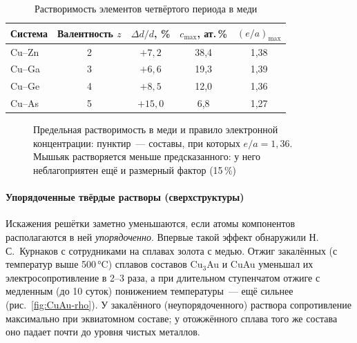 \begin{table}[ht]
\centering
\caption{Растворимость элементов четвёртого периода в меди}
\label{tab:Cu-sol}
\small
\begin{tabular}{@{}lcccc@{}}
\toprule
Система & Валентность $z$ & $\Delta d/d$, \% & $c_\text{max}$, ат.\,\% & $(e/a)_\text{max}$ \\
\midrule
Cu--Zn & 2 & $+7{,}2$ & 38,4 & 1,38 \\
Cu--Ga & 3 & $+6{,}6$ & 19,3 & 1,39 \\
Cu--Ge & 4 & $+8{,}5$ & 12,0 & 1,36 \\
Cu--As & 5 & $+15{,}0$ & 6,8 & 1,27 \\
\bottomrule
\end{tabular}
\end{table}

\begin{figure}[ht]
\centering
{}
\caption{Предельная растворимость в меди и правило электронной
концентрации: пунктир~— составы, при которых $e/a=1{,}36$. Мышьяк
растворяется меньше предсказанного: у него неблагоприятен ещё и
размерный фактор (15\,\%)}
\label{fig:Cu-sol}
\end{figure}

\paragraph{Упорядоченные твёрдые растворы (сверхструктуры)}
Искажения решётки заметно уменьшаются, если атомы компонентов
располагаются в ней \emph{упорядоченно}. Впервые такой эффект обнаружили
Н.\,С.~Курнаков с сотрудниками на сплавах золота с медью. Отжиг
закалённых (с температур выше 500\,°C) сплавов составов Cu$_3$Au и CuAu
уменьшал их электросопротивление в 2--3 раза, а при длительном
ступенчатом отжиге с медленным (до 10 суток) понижением температуры~—
ещё сильнее (рис.~\ref{fig:CuAu-rho}). У закалённого
(неупорядоченного) раствора сопротивление максимально при
эквиатомном составе; у отожжённого сплава того же состава оно падает
почти до уровня чистых металлов.

